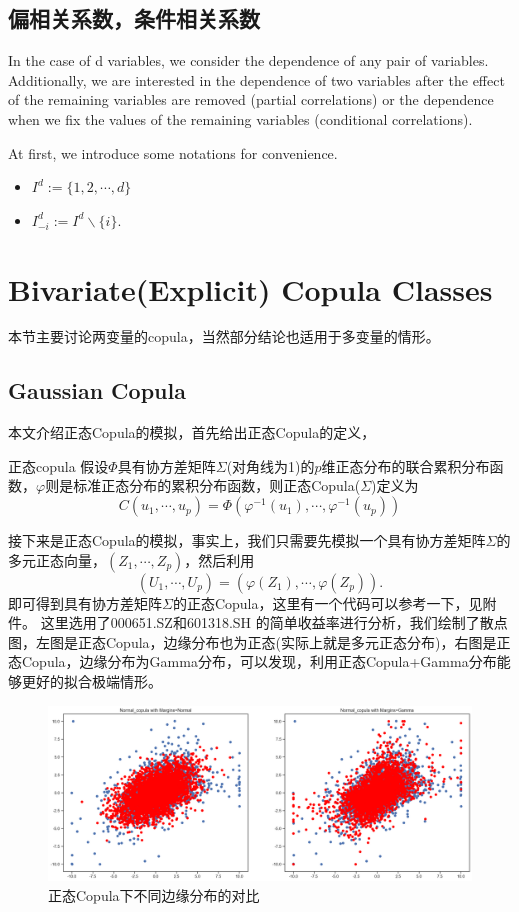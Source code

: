 \documentclass[12pt]{article}
\begin{document}
\subsection{偏相关系数，条件相关系数}
In the case of d variables, we consider the dependence of any pair of variables.
Additionally, we are interested in the dependence of two variables after the effect of
the remaining variables are removed (partial correlations) or the dependence when
we fix the values of the remaining variables (conditional correlations). \par
At first, we introduce some notations for convenience.
\begin{itemize}
	\item $I^d := \{1,2,\cdots,d\}$
	\item $I^d_{-i} := I^d \backslash \{i\}$.
\end{itemize}







\section{Bivariate(Explicit) Copula Classes}
本节主要讨论两变量的copula，当然部分结论也适用于多变量的情形。
\subsection{Gaussian Copula}
本文介绍正态Copula的模拟，首先给出正态Copula的定义，
\begin{sdefinition}{正态copula}{}
假设$\Phi$具有协方差矩阵$\Sigma$(对角线为1)的$p$维正态分布的联合累积分布函数，$\varphi$则是标准正态分布的累积分布函数，则正态Copula($\Sigma$)定义为
$$
C(u_1,\cdots,u_p) = \Phi(\varphi^{-1}(u_1),\cdots,\varphi^{-1}(u_p))
$$
\end{sdefinition}

接下来是正态Copula的模拟，事实上，我们只需要先模拟一个具有协方差矩阵$\Sigma$的多元正态向量，$(Z_1,\cdots,Z_p)$，然后利用
$$
(U_1,\cdots,U_p) = (\varphi(Z_1),\cdots,\varphi(Z_p)).
$$
即可得到具有协方差矩阵$\Sigma$的正态Copula，这里有一个代码可以参考一下，见附件。
这里选用了000651.SZ和601318.SH	的简单收益率进行分析，我们绘制了散点图，左图是正态Copula，边缘分布也为正态(实际上就是多元正态分布)，右图是正态Copula，边缘分布为Gamma分布，可以发现，利用正态Copula+Gamma分布能够更好的拟合极端情形。

\begin{figure}[htb]
	\centering
	\includegraphics[scale=0.4]{figure/Copula_contrast.png}
	\caption{正态Copula下不同边缘分布的对比}
\end{figure}
\end{document}
